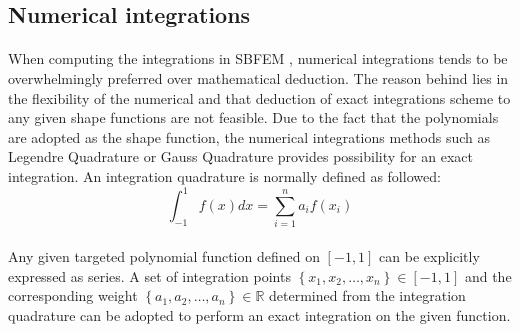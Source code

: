 


\subsection{Numerical integrations}
\label{subsection:numerical_integration}
\paragraph{}
When computing the integrations in SBFEM %
    , numerical integrations tends to be overwhelmingly preferred over mathematical deduction. 
The reason behind lies in the flexibility of the numerical and that deduction of exact integrations scheme 
    to any given shape functions are not feasible. 
Due to the fact that the polynomials are adopted as the shape function, the numerical integrations methods 
    such as Legendre Quadrature or Gauss Quadrature provides possibility for an exact integration. 
An integration quadrature is normally defined as followed:
    \begin{equation}
        \int_{-1}^{1}
        f(x)dx 
        = \sum_{i=1}^n
        a_i f(x_i)
    \label{eq:numerical_integration}
    \end{equation}

\paragraph{}
Any given targeted polynomial function defined on $[-1,1]$ can be explicitly expressed as series.
A set of integration points $\left\{ x_1, x_2, \dots, x_n \right\} \in \left[-1,1\right]$ and the corresponding weight $\left\{ a_1, a_2, 
    \dots, a_n \right\} \in \mathbb{R}$ determined from the integration quadrature can be adopted to perform an exact integration
    on the given function.
